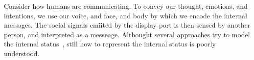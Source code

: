 

Consider how humans are communicating. To convey our thought, emotions, and intentions, we use our voice, and face, and body by which we encode the internal messages. The social signals emiited by the display port is then sensed by another person, and interpreted as a messeage. Althought several approaches try to model the internal status~\cite{}, still how to represent the internal status is poorly understood.  

